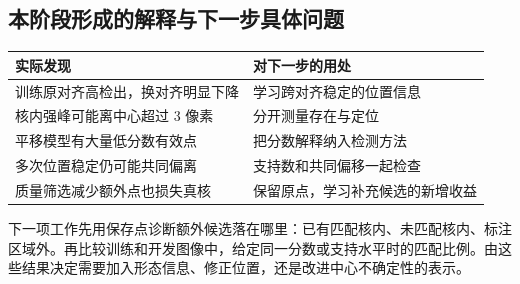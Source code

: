 \documentclass[
  12pt,
  fontset=fandol]{ctexart}
\newcounter{none} %
\begin{document}
\subsection{本阶段形成的解释与下一步具体问题}\label{chapter13}
{\def\LTcaptype{none}
\begin{longtable}[]{@{}
  >{\raggedright\arraybackslash}p{}
  >{\raggedright\arraybackslash}p{}@{}}
\toprule\noalign{}
实际发现 & 对下一步的用处\\
\midrule\noalign{}
\endhead
\bottomrule\noalign{}
\endlastfoot
训练原对齐高检出，换对齐明显下降 & 学习跨对齐稳定的位置信息\\
核内强峰可能离中心超过 3 像素 & 分开测量存在与定位\\
平移模型有大量低分数有效点 & 把分数解释纳入检测方法\\
多次位置稳定仍可能共同偏离 & 支持数和共同偏移一起检查\\
质量筛选减少额外点也损失真核 & 保留原点，学习补充候选的新增收益\\
\end{longtable}}
下一项工作先用保存点诊断额外候选落在哪里：已有匹配核内、未匹配核内、标注区域外。再比较训练和开发图像中，给定同一分数或支持水平时的匹配比例。由这些结果决定需要加入形态信息、修正位置，还是改进中心不确定性的表示。
\end{document}
